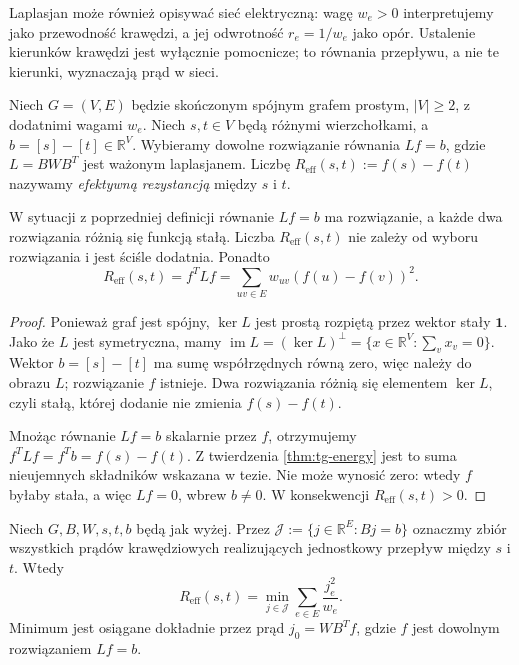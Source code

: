 Laplasjan może również opisywać sieć elektryczną: wagę $w_e>0$
interpretujemy jako przewodność krawędzi, a jej odwrotność
$r_e=1/w_e$ jako opór. Ustalenie kierunków krawędzi jest wyłącznie
pomocnicze; to równania przepływu, a nie te kierunki, wyznaczają
prąd w sieci.

\begin{definicja}
Niech $G=(V,E)$ będzie skończonym spójnym grafem prostym,
$|V|\ge2$, z dodatnimi wagami $w_e$. Niech $s,t\in V$
będą różnymi wierzchołkami, a $b=[s]-[t]\in\mathbb R^V$.
Wybieramy dowolne rozwiązanie równania $Lf=b$,
gdzie $L=BWB^T$ jest ważonym laplasjanem.
Liczbę $R_{\mathrm{eff}}(s,t):=f(s)-f(t)$ nazywamy
\emph{efektywną rezystancją} między $s$ i $t$.
\end{definicja}

\begin{stwierdzenie}
W sytuacji z poprzedniej definicji równanie $Lf=b$ ma
rozwiązanie, a każde dwa rozwiązania różnią się funkcją stałą.
Liczba $R_{\mathrm{eff}}(s,t)$ nie zależy od wyboru rozwiązania
i jest ściśle dodatnia. Ponadto
\[
R_{\mathrm{eff}}(s,t)=f^TLf
   =\sum_{uv\in E}w_{uv}(f(u)-f(v))^2.
\]
\end{stwierdzenie}

\begin{proof}
Ponieważ graf jest spójny, $\ker L$ jest prostą
rozpiętą przez wektor stały $\mathbf1$. Jako że $L$
jest symetryczna, mamy
$\operatorname{im}L=(\ker L)^\perp
=\{x\in\mathbb R^V:\sum_vx_v=0\}$.
Wektor $b=[s]-[t]$ ma sumę współrzędnych równą zero,
więc należy do obrazu $L$; rozwiązanie $f$ istnieje.
Dwa rozwiązania różnią się elementem $\ker L$,
czyli stałą, której dodanie nie zmienia $f(s)-f(t)$.

Mnożąc równanie $Lf=b$ skalarnie przez $f$,
otrzymujemy $f^TLf=f^Tb=f(s)-f(t)$.
Z twierdzenia \ref{thm:tg-energy} jest to suma
nieujemnych składników wskazana w tezie.
Nie może wynosić zero: wtedy $f$ byłaby stała,
a więc $Lf=0$, wbrew $b\ne0$. W konsekwencji
$R_{\mathrm{eff}}(s,t)>0$.
\end{proof}

\begin{twierdzenie}
Niech $G,B,W,s,t,b$ będą jak wyżej. Przez
$\mathcal J:=\{j\in\mathbb R^E:Bj=b\}$ oznaczmy
zbiór wszystkich prądów krawędziowych realizujących
jednostkowy przepływ między $s$ i $t$.
Wtedy
\[
R_{\mathrm{eff}}(s,t)
=\min_{j\in\mathcal J}\sum_{e\in E}\frac{j_e^2}{w_e}.
\]
Minimum jest osiągane dokładnie przez prąd
$j_0=WB^Tf$, gdzie $f$ jest dowolnym rozwiązaniem $Lf=b$.
\end{twierdzenie}

